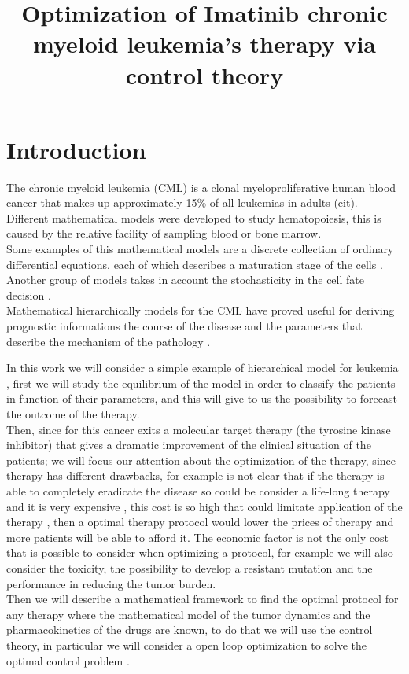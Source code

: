 \documentclass[a4paper,10pt]{article}
\date{}
\author{}
\begin{document}
\title{Optimization of Imatinib chronic myeloid leukemia's therapy via control theory}
\maketitle



\section{Introduction}
The chronic myeloid leukemia (CML) is a clonal myeloproliferative  human blood cancer that 
makes up approximately 15\% of all leukemias in adults (cit).
Different mathematical models were developed to study
hematopoiesis, this is caused by the relative facility of sampling blood or bone marrow.\\
Some examples of this mathematical models are
 a discrete collection of ordinary differential equations,
 each of which describes a
maturation stage  of the cells \cite{michor2005, sottoriva, czochra}.
 Another group of models  takes in account the 
stochasticity in the cell fate decision \cite{till1964stochastic,tomasetti2010role}.\\
Mathematical hierarchically models for the CML have proved useful for deriving prognostic
informations the course of the disease 
and the parameters that describe the mechanism of the
pathology
\cite{michor2005, sottoriva, olshen2014dynamics, tang2011dynamics}.

In this work we will consider a simple example of hierarchical 
model for leukemia  \cite{stiehl2012mathematical},  first we will
study the equilibrium of the model in order to classify the patients in function of their
parameters, and this will give to us the possibility to forecast the outcome of the therapy.\\
Then, since for this cancer exits a 
molecular target therapy (the tyrosine kinase inhibitor)
that gives a dramatic improvement of the clinical
situation of the patients; we will focus our attention 
about the optimization of the therapy,
since therapy has different drawbacks, for example is not clear that
if the therapy
is able to completely eradicate the disease \cite{michor2005}
so could be consider a life-long therapy and 
it is very expensive \cite{experts2013price}, 
this cost is so high that could limitate
application of the therapy \cite{himmelstein2009medical,chen2017journey},
then a optimal therapy protocol would lower the prices of therapy and 
more patients will be able to afford it. The economic  factor is not the only 
 cost that is possible to consider when optimizing a protocol, for example we will also
 consider the toxicity, the possibility to develop a resistant mutation and the performance
 in reducing the tumor burden.\\
Then we will describe a mathematical framework to 
find the optimal protocol for any therapy where the mathematical model of the
tumor dynamics and the pharmacokinetics of the drugs are known,
 to do that we will use the control theory,   in particular we will 
consider a open loop optimization to solve the optimal control problem \cite{chapman-book}.
\end{document}
